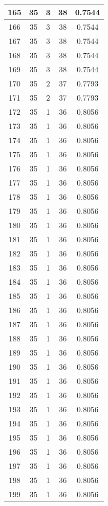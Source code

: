 \documentclass[letterpaper, 12pt]{article}
\begin{document}
\begin{longtable}{|c|c|c|c|c|}
\hline
165 & 35 & 3 & 38 & 0.7544 \\
\hline
166 & 35 & 3 & 38 & 0.7544 \\
\hline
167 & 35 & 3 & 38 & 0.7544 \\
\hline
168 & 35 & 3 & 38 & 0.7544 \\
\hline
169 & 35 & 3 & 38 & 0.7544 \\
\hline
170 & 35 & 2 & 37 & 0.7793 \\
\hline
171 & 35 & 2 & 37 & 0.7793 \\
\hline
172 & 35 & 1 & 36 & 0.8056 \\
\hline
173 & 35 & 1 & 36 & 0.8056 \\
\hline
174 & 35 & 1 & 36 & 0.8056 \\
\hline
175 & 35 & 1 & 36 & 0.8056 \\
\hline
176 & 35 & 1 & 36 & 0.8056 \\
\hline
177 & 35 & 1 & 36 & 0.8056 \\
\hline
178 & 35 & 1 & 36 & 0.8056 \\
\hline
179 & 35 & 1 & 36 & 0.8056 \\
\hline
180 & 35 & 1 & 36 & 0.8056 \\
\hline
181 & 35 & 1 & 36 & 0.8056 \\
\hline
182 & 35 & 1 & 36 & 0.8056 \\
\hline
183 & 35 & 1 & 36 & 0.8056 \\
\hline
184 & 35 & 1 & 36 & 0.8056 \\
\hline
185 & 35 & 1 & 36 & 0.8056 \\
\hline
186 & 35 & 1 & 36 & 0.8056 \\
\hline
187 & 35 & 1 & 36 & 0.8056 \\
\hline
188 & 35 & 1 & 36 & 0.8056 \\
\hline
189 & 35 & 1 & 36 & 0.8056 \\
\hline
190 & 35 & 1 & 36 & 0.8056 \\
\hline
191 & 35 & 1 & 36 & 0.8056 \\
\hline
192 & 35 & 1 & 36 & 0.8056 \\
\hline
193 & 35 & 1 & 36 & 0.8056 \\
\hline
194 & 35 & 1 & 36 & 0.8056 \\
\hline
195 & 35 & 1 & 36 & 0.8056 \\
\hline
196 & 35 & 1 & 36 & 0.8056 \\
\hline
197 & 35 & 1 & 36 & 0.8056 \\
\hline
198 & 35 & 1 & 36 & 0.8056 \\
\hline
199 & 35 & 1 & 36 & 0.8056 \\
\hline
\end{longtable}
\end{document}
